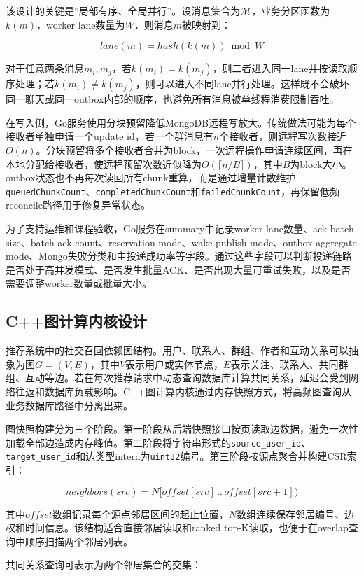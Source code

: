 该设计的关键是“局部有序、全局并行”。设消息集合为$\mathcal{M}$，业务分区函数为$k(m)$，worker lane数量为$W$，则消息$m$被映射到：

\[
  lane(m)=hash(k(m)) \bmod W
\]

对于任意两条消息$m_i,m_j$，若$k(m_i)=k(m_j)$，则二者进入同一lane并按读取顺序处理；若$k(m_i)\ne k(m_j)$，则可以进入不同lane并行处理。这样既不会破坏同一聊天或同一outbox内部的顺序，也避免所有消息被单线程消费限制吞吐。

在写入侧，Go服务使用分块预留降低MongoDB远程写放大。传统做法可能为每个接收者单独申请一个update id，若一个群消息有$n$个接收者，则远程写次数接近$O(n)$。分块预留将多个接收者合并为block，一次远程操作申请连续区间，再在本地分配给接收者，使远程预留次数近似降为$O(\lceil n/B \rceil)$，其中$B$为block大小。outbox状态也不再每次读回所有chunk重算，而是通过增量计数维护\texttt{queuedChunkCount}、\texttt{completedChunkCount}和\texttt{failedChunkCount}，再保留低频reconcile路径用于修复异常状态。

为了支持运维和课程验收，Go服务在summary中记录worker lane数量、ack batch size、batch ack count、reservation mode、wake publish mode、outbox aggregate mode、Mongo失败分类和主投递成功率等字段。通过这些字段可以判断投递链路是否处于高并发模式、是否发生批量ACK、是否出现大量可重试失败，以及是否需要调整worker数量或批量大小。

\subsection{C++图计算内核设计}

推荐系统中的社交召回依赖图结构。用户、联系人、群组、作者和互动关系可以抽象为图$G=(V,E)$，其中$V$表示用户或实体节点，$E$表示关注、联系人、共同群组、互动等边。若在每次推荐请求中动态查询数据库计算共同关系，延迟会受到网络往返和数据库负载影响。C++图计算内核通过内存快照方式，将高频图查询从业务数据库路径中分离出来。

图快照构建分为三个阶段。第一阶段从后端快照接口按页读取边数据，避免一次性加载全部边造成内存峰值。第二阶段将字符串形式的\texttt{source\_user\_id}、\texttt{target\_user\_id}和边类型intern为\texttt{uint32}编号。第三阶段按源点聚合并构建CSR索引：

\[
  neighbors(src)=N[offset[src]\,..\,offset[src+1])
\]

其中$offset$数组记录每个源点邻居区间的起止位置，$N$数组连续保存邻居编号、边权和时间信息。该结构适合直接邻居读取和ranked top-K读取，也便于在overlap查询中顺序扫描两个邻居列表。

共同关系查询可表示为两个邻居集合的交集：

